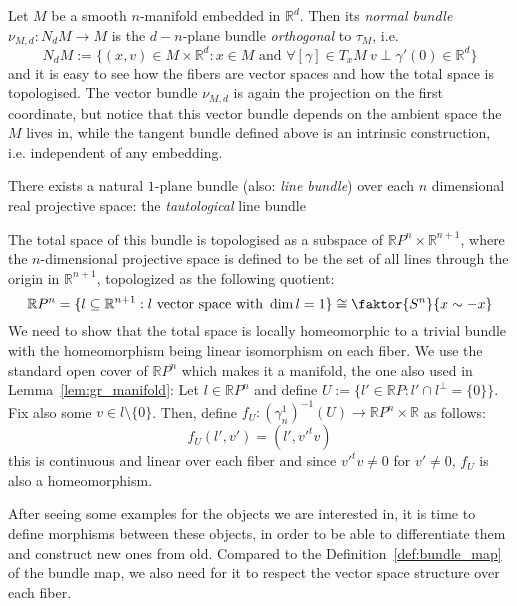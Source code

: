 \begin{examples}
\begin{i_enum}
\item Let $M$ be a smooth $n$-manifold embedded in $\mathbb{R}^d$. Then its \emph{normal bundle} $\nu_{M,d}:N_dM\to M$ is the $d-n$-plane bundle \emph{orthogonal} to $\tau_M$, i.e.
\[N_dM:=\big\{(x,v)\in M\times\mathbb{R}^d:x\in M\text{ and }\forall[\gamma]\in T_xM\ v\perp\gamma'(0)\in\mathbb{R}^d\big\}\]
and it is easy to see how the fibers are vector spaces and how the total space is topologised. The vector bundle $\nu_{M,d}$ is again the projection on the first coordinate, but notice that this vector bundle depends on the ambient space the $M$ lives in, while the tangent bundle defined above is an intrinsic construction, i.e. independent of any embedding.
\item There exists a natural $1$-plane bundle (also: \emph{line bundle}) over each $n$ dimensional real projective space: the \emph{tautological} line bundle
\begin{center}
\end{center}
The total space of this bundle is topologised as a subspace of $\mathbb{R}P^n\times\mathbb{R}^{n+1}$, where the $n$-dimensional projective space is defined to be the set of all lines through the origin in $\mathbb{R}^{n+1}$, topologized as the following quotient:
\[\mathbb{R}P^n=\{l\subseteq\mathbb{R}^{n+1}:l\text{ vector space with }\dim l=1\}\cong\faktor{S^n}{x\sim-x}\]
We need to show that the total space is locally homeomorphic to a trivial bundle with the homeomorphism being linear isomorphism on each fiber. We use the standard open cover of $\mathbb{R}P^n$ which makes it a manifold, the one also used in Lemma~\ref{lem:gr_manifold}: Let $l\in\mathbb{R}P^n$ and define $U:=\{l'\in\mathbb{R}P:l'\cap l^{\perp}=\{0\}\}$. Fix also some $v\in l\setminus\{0\}$. Then, define $f_U:(\gamma_n^1)^{-1}(U)\to\mathbb{R}P^n\times\mathbb{R}$ as follows:
\[f_U(l',v')=(l',v'^tv)\]
this is continuous and linear over each fiber and since $v'^tv\neq0$ for $v'\neq0$, $f_U$ is also a homeomorphism.
\end{i_enum}
\end{examples}

After seeing some examples for the objects we are interested in, it is time to define morphisms between these objects, in order to be able to differentiate them and construct new ones from old. Compared to the Definition~\ref{def:bundle_map} of the bundle map, we also need for it to respect the vector space structure over each fiber.

